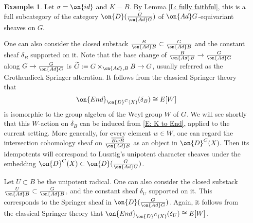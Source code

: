 \documentclass[11pt]{amsart}
\theoremstyle{definition}
\theoremstyle{definition}
\newtheorem{ex}[thm]{Example}
\theoremstyle{definition}
\numberwithin{equation}{subsection}
\newcommand{\Ad}{{\on{Ad}}}
\newcommand{\End}{{\on{End}}}
\newcommand{\id}{{\on{id}}}
\begin{document}
\begin{ex} 
\label{Ex:springer}
Let $\sigma=\id$ and $K=B$.  By Lemma \ref{L: fully faithful}, this is a full subcategory of the category $\on{D}(\frac{G}{\Ad G})$ of $\Ad G$-equivariant sheaves  on $G$.


One can also consider the closed substack $\frac{B}{\Ad B}\subset \frac{G}{\Ad B}$ and the constant sheaf $\delta_{B}$ supported on it. Note that the base change of $\frac{B}{\Ad B}\to \frac{G}{\Ad G}$ along $G\to \frac{G}{\Ad G}$ is
$\widetilde G:=G\times_{\Ad,B}B\to G$, usually referred as the Grothendieck-Springer alteration. It follows from the classical Springer theory that 
$$\End_{\on{D}^{C}(X)}(\delta_{B})\cong E[W]$$ 
is isomorphic to the group algebra of the Weyl group $W$ of $G$. We will see shortly that this $W$-action on $\delta_{B}$ can be induced from \eqref{E: K to End}, applied to the current setting. More generally, for every element $w\in W$, one can regard the intersection cohomology sheaf on $\frac{\overline{BwB}}{\Ad B}$ as an object in $\on{D}^{C}(X)$. Then its idempotents will correspond to Lusztig's unipotent character sheaves under the embedding $\on{D}^{C}(X)\subset \on{D}(\frac{G}{\Ad G})$.

Let $U\subset B$ be the unipotent radical. One can also consider the closed substack $\frac{U}{\Ad B}\subset \frac{G}{\Ad B}$, and the constant sheaf $\delta_{U}$ supported on it. This corresponds to the Springer sheaf in $\on{D}(\frac{G}{\Ad G})$.
Again, it follows from the classical Springer theory that
$\End_{\on{D}^C(X)}(\delta_{U})\cong E[W]$.  
\end{ex}
\end{document}
